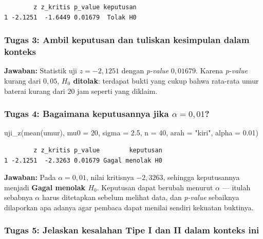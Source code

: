 \documentclass[
  indonesian,
  letterpaper,
]{book}
\newenvironment{Shaded}{\begin{snugshade}}{\end{snugshade}}
\newcommand{\AttributeTok}[1]{\textcolor[rgb]{0.40,0.45,0.13}{#1}}
\newcommand{\DecValTok}[1]{\textcolor[rgb]{0.68,0.00,0.00}{#1}}
\newcommand{\FloatTok}[1]{\textcolor[rgb]{0.68,0.00,0.00}{#1}}
\newcommand{\FunctionTok}[1]{\textcolor[rgb]{0.28,0.35,0.67}{#1}}
\newcommand{\NormalTok}[1]{\textcolor[rgb]{0.00,0.23,0.31}{#1}}
\newcommand{\StringTok}[1]{\textcolor[rgb]{0.13,0.47,0.30}{#1}}
\begin{document}
\begin{verbatim}
        z z_kritis p_value keputusan
1 -2.1251  -1.6449 0.01679  Tolak H0
\end{verbatim}

\subsubsection{Tugas 3: Ambil keputusan dan tuliskan kesimpulan dalam
konteks}\label{tugas-3-ambil-keputusan-dan-tuliskan-kesimpulan-dalam-konteks}

\textbf{Jawaban:} Statistik uji \(z = -2{,}1251\) dengan \emph{p-value}
\(0{,}01679\). Karena \emph{p-value} kurang dari \(0{,}05\),
\textbf{\(H_0\) ditolak}: terdapat bukti yang cukup bahwa rata-rata umur
baterai kurang dari \(20\) jam seperti yang diklaim.

\subsubsection{\texorpdfstring{Tugas 4: Bagaimana keputusannya jika
\(\alpha = 0{,}01\)?}{Tugas 4: Bagaimana keputusannya jika \textbackslash alpha = 0\{,\}01?}}\label{tugas-4-bagaimana-keputusannya-jika-alpha-001}

\begin{Shaded}
\begin{Highlighting}[]
\FunctionTok{uji\_z}\NormalTok{(}\FunctionTok{mean}\NormalTok{(umur), }\AttributeTok{mu0 =} \DecValTok{20}\NormalTok{, }\AttributeTok{sigma =} \FloatTok{2.5}\NormalTok{, }\AttributeTok{n =} \DecValTok{40}\NormalTok{, }\AttributeTok{arah =} \StringTok{"kiri"}\NormalTok{, }\AttributeTok{alpha =} \FloatTok{0.01}\NormalTok{)}
\end{Highlighting}
\end{Shaded}

\begin{verbatim}
        z z_kritis p_value        keputusan
1 -2.1251  -2.3263 0.01679 Gagal menolak H0
\end{verbatim}

\textbf{Jawaban:} Pada \(\alpha = 0{,}01\), nilai kritisnya
\(-2{,}3263\), sehingga keputusannya menjadi \textbf{Gagal menolak
\(H_0\)}. Keputusan dapat berubah menurut \(\alpha\) --- itulah sebabnya
\(\alpha\) harus ditetapkan sebelum melihat data, dan \emph{p-value}
sebaiknya dilaporkan apa adanya agar pembaca dapat menilai sendiri
kekuatan buktinya.

\subsubsection{Tugas 5: Jelaskan kesalahan Tipe I dan II dalam konteks
ini}\label{tugas-5-jelaskan-kesalahan-tipe-i-dan-ii-dalam-konteks-ini}
\end{document}
